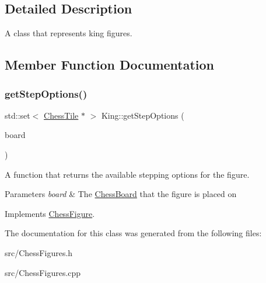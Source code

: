 \subsection{Detailed Description}
A class that represents king figures. 

\subsection{Member Function Documentation}
\mbox{\label{classKing_a69703f80ac8c30335e4d745ee11518d7}} 
\subsubsection{\texorpdfstring{get\+Step\+Options()}{getStepOptions()}}
{\footnotesize\ttfamily std\+::set$<$ \mbox{\hyperlink{classChessTile}{Chess\+Tile}} $\ast$ $>$ King\+::get\+Step\+Options (\begin{DoxyParamCaption}\item[{\mbox{\hyperlink{classChessBoard}{Chess\+Board}} \&}]{board }\end{DoxyParamCaption})\hspace{0.3cm}{\ttfamily [virtual]}}



A function that returns the available stepping options for the figure. 


\begin{DoxyParams}{Parameters}
{\em board} & The \mbox{\hyperlink{classChessBoard}{Chess\+Board}} that the figure is placed on \\
\hline
\end{DoxyParams}


Implements \mbox{\hyperlink{classChessFigure_ae78d52e35c4ea926f492d211c69758bd}{Chess\+Figure}}.



The documentation for this class was generated from the following files\+:\begin{DoxyCompactItemize}
\item 
src/Chess\+Figures.\+h\item 
src/Chess\+Figures.\+cpp\end{DoxyCompactItemize}
